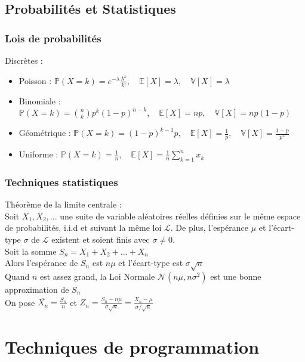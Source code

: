 \documentclass[8pt]{article}
\begin{document}
        \subsection{Probabilités et Statistiques}
            \subsubsection{Lois de probabilités}
            Discrètes :
                \begin{itemize}
                    \item Poisson : $\mathbb{P} (X=k) = e^{-\lambda}\frac{\lambda^k}{k!}, \quad \mathbb{E}[X]=\lambda, \quad \mathbb{V}[X]=\lambda$
                    \item Binomiale : $\mathbb{P}(X=k) = \binom{n}{k} p^k (1-p)^{n-k}, \quad \mathbb{E}[X] = np, \quad \mathbb{V}[X] = np(1-p)$
                    \item Géométrique : $\mathbb{P}(X=k) = (1-p)^{k-1}p, \quad \mathbb{E}[X] = \frac{1}{p}, \quad \mathbb{V}[X] = \frac{1-p}{p^{2}}$
                    \item Uniforme : $\mathbb{P}(X=k) = \frac{1}{n}, \quad \mathbb{E}[X] = \frac{1}{n}  \sum^{n}_{k=1} x_k$
                \end{itemize}
            \subsubsection{Techniques statistiques}
            Théorème de la limite centrale : \\
            Soit $X_1,X_2,...$ une suite de variable aléatoires réelles définies sur le même espace de probabilités, i.i.d et suivant la même loi $\mathcal{L}$.
            De plus, l'espérance $\mu$ et l'écart-type $\sigma$ de $\mathcal{L}$ existent et soient finis avec $\sigma \neq 0$.\\
            Soit la somme $S_n = X_1 + X_2 + ... + X_n$\\
            Alors l'espérance de $S_n$ est $n\mu$ et l'écart-type est $\sigma \sqrt{n}$\\
            Quand $n$ est assez grand, la Loi Normale $\mathcal{N}(n\mu,n\sigma^{2})$ est une bonne approximation de $S_n$\\
            On pose $\overline{X_n} = \frac{S_n}{n}$ et $Z_n = \frac{S_n-n\mu}{\sigma \sqrt{n}} = \frac{\overline{X_n}-\mu}{\sigma / \sqrt{n}}$
    \section{Techniques de programmation}
\end{document}

